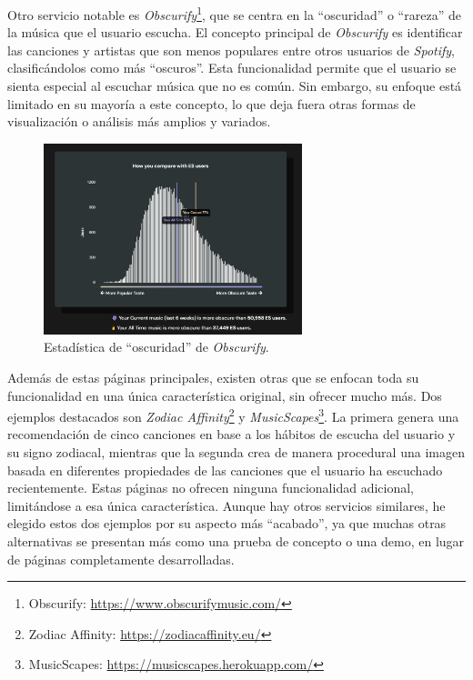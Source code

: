 
Otro servicio notable es \textit{Obscurify}\footnote{Obscurify: \url{https://www.obscurifymusic.com/}}, que se centra en la ``oscuridad'' o ``rareza'' de la música que el usuario escucha. El concepto principal de \textit{Obscurify} es identificar las canciones y artistas que son menos populares entre otros usuarios de \textit{Spotify}, clasificándolos como más ``oscuros''. Esta funcionalidad permite que el usuario se sienta especial al escuchar música que no es común. Sin embargo, su enfoque está limitado en su mayoría a este concepto, lo que deja fuera otras formas de visualización o análisis más amplios y variados.


\begin{figure}[htbp]
    \centering
    \includegraphics[width=0.67\textwidth]{figures/obscuify_stat.png}
    \caption{Estadística de ``oscuridad'' de \textit{Obscurify}.}
    \label{fig:obscurify_stat}
\end{figure}

Además de estas páginas principales, existen otras que se enfocan toda su funcionalidad en una única característica original, sin ofrecer mucho más. Dos ejemplos destacados son \textit{Zodiac Affinity}\footnote{Zodiac Affinity: \url{https://zodiacaffinity.eu/}} y \textit{MusicScapes}\footnote{MusicScapes: \url{https://musicscapes.herokuapp.com/}}. La primera genera una recomendación de cinco canciones en base a los hábitos de escucha del usuario y su signo zodiacal, mientras que la segunda crea de manera procedural una imagen basada en diferentes propiedades de las canciones que el usuario ha escuchado recientemente. Estas páginas no ofrecen ninguna funcionalidad adicional, limitándose a esa única característica. Aunque hay otros servicios similares, he elegido estos dos ejemplos por su aspecto más ``acabado'', ya que muchas otras alternativas se presentan más como una prueba de concepto o una demo, en lugar de páginas completamente desarrolladas.

